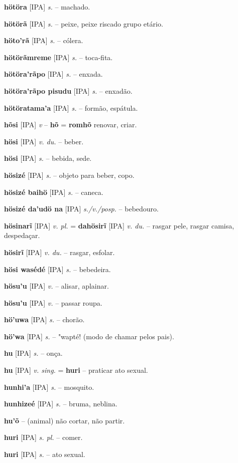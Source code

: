 \textbf{hötöra} [IPA] \textit{s.} -- machado.

\textbf{hötörã} [IPA] \textit{s.} -- peixe, peixe riscado  grupo etário.

\textbf{höto'rã} [IPA] \textit{s.} -- cólera.

\textbf{hötörãmreme} [IPA] \textit{s.} -- toca-fita.

\textbf{hötöra'rãpo} [IPA] \textit{s.} -- enxada.

\textbf{hötöra'rãpo pisudu} [IPA] \textit{s.} -- enxadão.

\textbf{hötöratama'a} [IPA] \textit{s.} -- formão, espátula.

\textbf{hõsi} [IPA] \textit{v} -- \textbf{hõ} = \textbf{romhõ} renovar, criar.

\textbf{hösi} [IPA] \textit{v. du.} -- beber.

\textbf{hösi} [IPA] \textit{s.} -- bebida, sede.

\textbf{hösizé} [IPA] \textit{s.} -- objeto para beber, copo.

\textbf{hösizé baihö} [IPA] \textit{s.} -- caneca.

\textbf{hösizé da'udö na} [IPA] \textit{s./v./posp.} -- bebedouro.

\textbf{hösinarĩ} [IPA] \textit{v. pl.} = \textbf{dahösirĩ} [IPA] \textit{v. du.} -- rasgar pele, rasgar camisa, despedaçar.

\textbf{hösirĩ} [IPA] \textit{v. du.} -- rasgar, esfolar.

\textbf{hösi wasédé} [IPA] \textit{s.} -- bebedeira.

\textbf{hösu'u} [IPA] \textit{v.} -- alisar, aplainar.

\textbf{hösu'u} [IPA] \textit{v.} -- passar roupa.

\textbf{hö'uwa} [IPA] \textit{s.} -- chorão.

\textbf{hö'wa} [IPA] \textit{s.} -- "wapté! (modo de chamar pelos pais).

\textbf{hu} [IPA] \textit{s.} -- onça.

\textbf{hu} [IPA] \textit{v. sing.} = \textbf{huri} -- praticar ato sexual.

\textbf{hunhi'a} [IPA] \textit{s.} -- mosquito.

\textbf{hunhizeé} [IPA] \textit{s.} -- bruma, neblina.

\textbf{hu'õ} -- (animal) não cortar, não partir.

\textbf{huri} [IPA] \textit{s. pl.} -- comer.

\textbf{huri} [IPA] \textit{s.} -- ato sexual.

